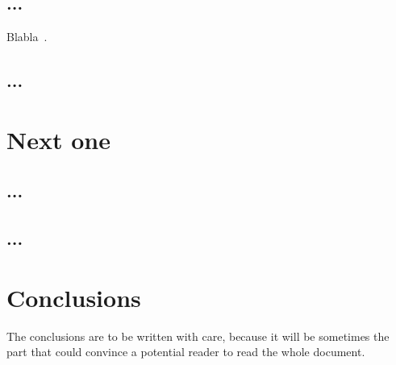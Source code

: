 \documentclass[11pt,a4paper,oneside]{book}
\begin{document}
\label{chap2}

\section{...}Blabla~\cite{ref4}.

\section{...}
\label{sec-untel}

\chapter{Next one}

\section{...}

\section{...}

\chapter*{Conclusions}

The conclusions are to be written with care, because it will be sometimes the part that could convince a potential reader to read the whole document.

\appendix

\backmatter

\printindex %



\end{document}
